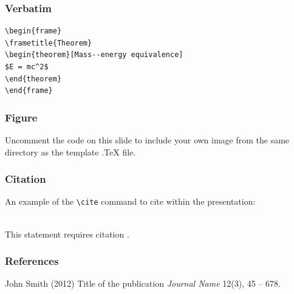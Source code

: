 \begin{frame}[fragile] %
\frametitle{Verbatim}
\begin{example}
\begin{verbatim}
\begin{frame}
\frametitle{Theorem}
\begin{theorem}[Mass--energy equivalence]
$E = mc^2$
\end{theorem}
\end{frame}\end{verbatim}
\end{example}
\end{frame}


\begin{frame}
\frametitle{Figure}
Uncomment the code on this slide to include your own image from the same directory as the template .TeX file.
\end{frame}


\begin{frame}[fragile] %
\frametitle{Citation}
An example of the \verb|\cite| command to cite within the presentation:\\~

This statement requires citation \cite{p1}.
\end{frame}


\begin{frame}
\frametitle{References}
\footnotesize{
\begin{thebibliography}{99} %
 John Smith (2012)
\newblock Title of the publication
\newblock \emph{Journal Name} 12(3), 45 -- 678.
\end{thebibliography}
}
\end{frame}

